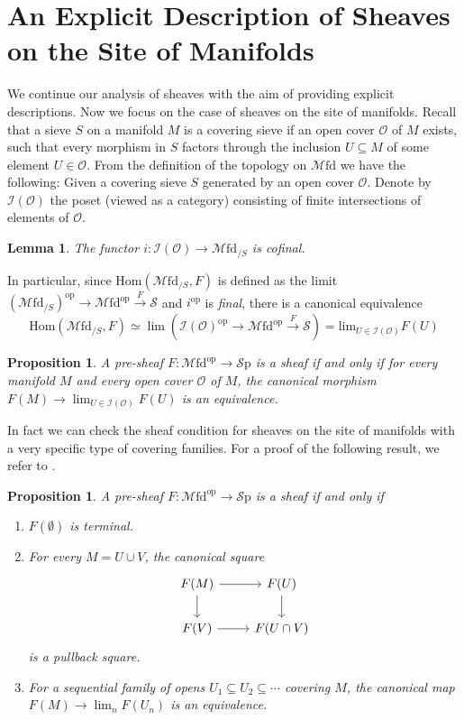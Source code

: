 \documentclass[a4paper]{book}
\newcommand{\lI}{\mathcal{I}}
\newcommand{\lM}{\mathcal{M}}
\newcommand{\lO}{\mathcal{O}}
\newcommand{\lS}{\mathcal{S}}
\newcommand{\op}{\mathrm{op}}
\newcommand{\Sp}{\lS\mathrm{p}} %
\renewcommand{\hom}{\mathrm{Hom}} %
\newcommand{\Mfd}{\lM\mathrm{fd}} %
\newtheorem{lemma}[equation]{Lemma}
\newtheorem{proposition}[equation]{Proposition}
\theoremstyle{definition}
\theoremstyle{remark}
\numberwithin{equation}{section}
\begin{document}
\section{An Explicit Description of Sheaves on the Site of Manifolds}
We continue our analysis of sheaves with the aim of providing explicit descriptions. Now we focus on the case of sheaves on the site of manifolds. Recall that a sieve $S$ on a manifold $M$ is a covering sieve if an open cover $\lO$ of $M$ exists, such that every morphism in $S$ factors through the inclusion $U\subseteq M$ of some element $U\in\lO$. From the definition of the topology on $\Mfd$ we have the following: Given a covering sieve $S$ generated by an open cover $\lO$. Denote by $\lI(\lO)$ the poset (viewed as a category) consisting of finite intersections of elements of $\lO$.
\begin{lemma}
	The functor $i:\lI(\lO)\rightarrow\Mfd_{/S}$ is cofinal.
\end{lemma}
In particular, since $\hom(\Mfd_{/S},F)$ is defined as the limit $(\Mfd_{/S})^{\op}\to\Mfd^{\op}\xrightarrow F\lS$ and $i^{\op}$ is \emph{final}, there is a canonical equivalence \[\hom(\Mfd_{/S},F)\simeq\lim(\lI(\lO)^{\op}\to\Mfd^{\op}\xrightarrow F\lS)=\textrm{lim}_{U\in\lI(\lO)}F(U)\]
\begin{proposition}\label{pro:sheaf}
  A pre-sheaf $F\colon \Mfd^{\op} \to \Sp$ is a sheaf if and only if for every manifold $M$ and every open cover $\lO$ of $M$, the canonical morphism $F(M) \to \lim_{U \in \lI(\lO)}F(U)$ is an equivalence.
\end{proposition}

In fact we can check the sheaf condition for sheaves on the site of manifolds with a very specific type of covering families. For a proof of the following result, we refer to \cite[Proposition 3.6.6]{amabeldebrayhaine2021diffcoh}.

\begin{proposition}
  A pre-sheaf $F\colon \Mfd^{\op} \to \Sp$ is a sheaf if and only if
  \begin{enumerate}
    \item $F(\emptyset)$ is terminal.
    \item For every $M = U \cup V$, the canonical square
    \[
      \begin{tikzcd}
        F(M) \ar[r] \ar[d] & F(U) \ar[d] \\
        F(V) \ar[r] & F(U \cap V)
      \end{tikzcd}
    \]is a pullback square. 
    \item For a sequential family of opens $U_1 \subseteq U_2 \subseteq \cdots$ covering $M$, the canonical map $F(M) \to \lim_{n} F(U_n)$ is an equivalence.
  \end{enumerate}
\end{proposition}
\end{document}
